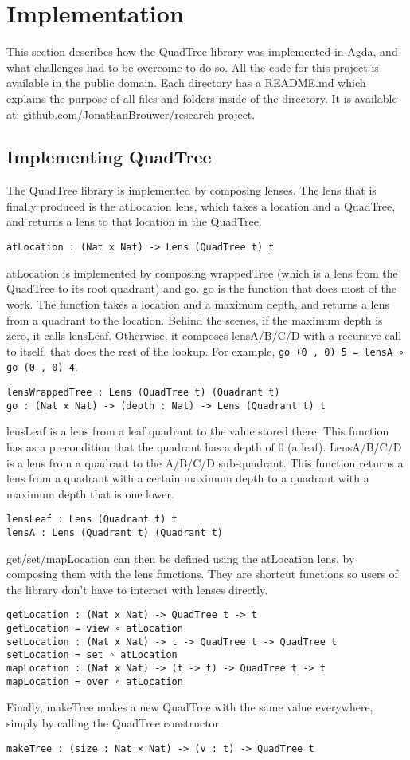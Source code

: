 \section{Implementation}
This section describes how the QuadTree library was implemented in Agda, and what challenges had to be overcome to do so. All the code for this project is available in the public domain. Each directory has a README.md which explains the purpose of all files and folders inside of the directory.
It is available at: \textcolor{blue}{\href{https://github.com/JonathanBrouwer/research-project}{github.com/JonathanBrouwer/research-project}}. 

\subsection{Implementing QuadTree}
The QuadTree library is implemented by composing lenses. The lens that is finally produced is the atLocation lens, which takes a location and a QuadTree, and returns a lens to that location in the QuadTree.
\begin{verbatim}
atLocation : (Nat x Nat) -> Lens (QuadTree t) t
\end{verbatim}
atLocation is implemented by composing wrappedTree (which is a lens from the QuadTree to its root quadrant) and go. go is the function that does most of the work. The function takes a location and a maximum depth, and returns a lens from a quadrant to the location. Behind the scenes, if the maximum depth is zero, it calls lensLeaf. Otherwise, it composes lensA/B/C/D with a recursive call to itself, that does the rest of the lookup. For example, \verb|go (0 , 0) 5 = lensA ∘ go (0 , 0) 4|.
\begin{verbatim}
lensWrappedTree : Lens (QuadTree t) (Quadrant t)
go : (Nat x Nat) -> (depth : Nat) -> Lens (Quadrant t) t
\end{verbatim}
lensLeaf is a lens from a leaf quadrant to the value stored there. This function has as a precondition that the quadrant has a depth of 0 (a leaf). LensA/B/C/D is a lens from a quadrant to the A/B/C/D sub-quadrant. This function returns a lens from a quadrant with a certain maximum depth to a quadrant with a maximum depth that is one lower. 
\begin{verbatim}
lensLeaf : Lens (Quadrant t) t
lensA : Lens (Quadrant t) (Quadrant t)
\end{verbatim}
get/set/mapLocation can then be defined using the atLocation lens, by composing them with the lens functions. They are shortcut functions so users of the library don't have to interact with lenses directly.
\begin{verbatim}
getLocation : (Nat x Nat) -> QuadTree t -> t
getLocation = view ∘ atLocation
setLocation : (Nat x Nat) -> t -> QuadTree t -> QuadTree t
setLocation = set ∘ atLocation
mapLocation : (Nat x Nat) -> (t -> t) -> QuadTree t -> t
mapLocation = over ∘ atLocation
\end{verbatim}
Finally, makeTree makes a new QuadTree with the same value everywhere, simply by calling the QuadTree constructor
\begin{verbatim}
makeTree : (size : Nat × Nat) -> (v : t) -> QuadTree t
\end{verbatim}

